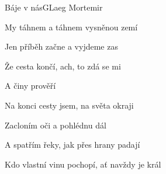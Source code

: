 \begin{song}{Báje v nás}{G}{Laeg Mortemir}
\begin{SBChorus*}
My táhnem a táhnem vysněnou zemí

Jen příběh začne a vyjdeme zas

Že cesta končí, ach, to zdá se mi

A činy prověří 

\end{SBChorus*}

\begin{SBVerse}

Na konci cesty jsem, na světa okraji

Zacloním oči a pohlédnu dál

A spatřím řeky, jak přes hrany padají

Kdo vlastní vinu pochopí, ať navždy je král

\end{SBVerse}

\begin{SBChorus}

\end{SBChorus}

\end{song}

\clearpage
